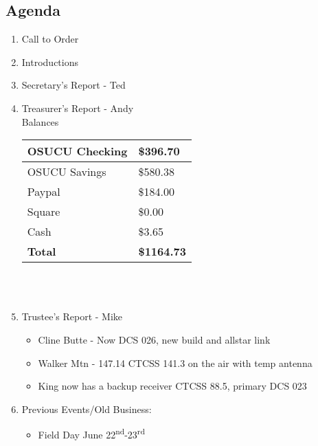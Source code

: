 \documentclass[letter,11pt]{extarticle}
\begin{document}
	\subsection*{Agenda}
	\begin{enumerate}
		\item Call to Order
		\item Introductions
		\item Secretary's Report - Ted
		\item Treasurer's Report - Andy \\
				Balances 
			\begin{tabular}{|l|l|} \hline
				OSUCU Checking & \$396.70 \\ \hline
				OSUCU Savings & \$580.38 \\ \hline
				Paypal & \$184.00 \\ \hline
				Square & \$0.00 \\ \hline
				Cash & \$3.65 \\ \hline
				\textbf{Total} & \textbf{\$1164.73} \\ \hline
			\end{tabular} \\ \\
		\item Trustee's Report - Mike
			\begin{itemize}
				\item Cline Butte - Now DCS 026, new build and allstar link
				\item Walker Mtn - 147.14 CTCSS 141.3 on the air with temp antenna
				\item King now has a backup receiver CTCSS 88.5, primary DCS 023
			\end{itemize}
		\item Previous Events/Old Business:
		\begin{itemize}
			\item Field Day June 22\textsuperscript{nd}-23\textsuperscript{rd}
		\end{itemize}
			

\end{enumerate}
\end{document}

